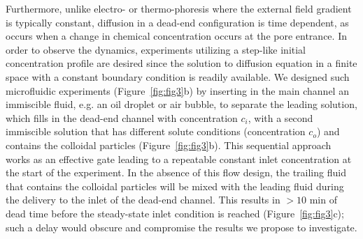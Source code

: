 \documentclass[11pt]{article}
\begin{document}
Furthermore, unlike electro- or thermo-phoresis where the external field
gradient is typically constant, diffusion in a dead-end configuration is
time dependent, as occurs when a change in chemical concentration occurs
at the pore entrance. In order to observe the dynamics, experiments
utilizing a step-like initial concentration profile are desired since
the solution to diffusion equation in a finite space with a constant
boundary condition is readily available.  We designed such microfluidic
experiments (Figure~\ref{fig:fig3}b) by inserting in the main channel
an immiscible fluid, e.g. an oil droplet or air bubble, to separate the
leading solution, which fills in the dead-end channel with concentration
$c_i$, with a second immiscible solution that has different solute
conditions (concentration $c_o$) and contains the colloidal particles
(Figure~\ref{fig:fig3}b). This sequential approach works as an effective
gate leading to a repeatable constant inlet concentration at the start
of the experiment. In the absence of this flow design, the trailing
fluid that contains the colloidal particles will be mixed with the
leading fluid during the delivery to the inlet of the dead-end channel.
This results in $> 10$ min of dead time before the steady-state inlet
condition is reached (Figure~\ref{fig:fig3}c); such a delay would
obscure and compromise the results we propose to investigate.
\end{document}
